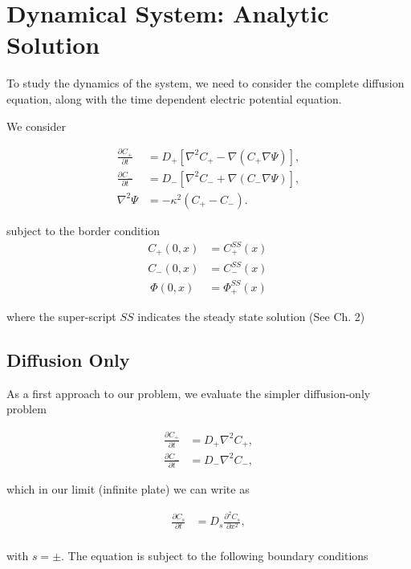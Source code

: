 \section{Dynamical System: Analytic Solution}

To study the dynamics of the system, we need to consider the complete diffusion equation, along with the time dependent electric potential equation.

We consider

\begin{align}
\frac{\partial C_+}{\partial t} &= D_+ \left[\nabla^2 C_+ -  \nabla (C_+ \nabla \Psi) \right] , \\
\frac{\partial C_-}{\partial t} &= D_- \left[\nabla^2 C_- + \nabla (C_- \nabla \Psi) \right], \\
\nabla^2 \Psi &= -\kappa^2 \left(C_+ - C_- \right).
\label{eq:dynamic-system}
\end{align}

subject to the border condition 
\begin{align}
C_+(0, x) & = C^{SS}_+(x)\\
C_-(0, x) & =  C^{SS}_-(x)\\\
\Phi(0, x) &= \Phi^{SS}_+(x)\
\end{align}

where the super-script $SS$ indicates the steady state solution (See Ch. 2)%

\subsection{Diffusion Only}

As a first approach to our problem, we evaluate the simpler diffusion-only problem



\begin{align}
\frac{\partial C_+}{\partial t} &= D_+ \nabla^2 C_+,\\
\frac{\partial C_-}{\partial t} &= D_- \nabla^2 C_-,
\label{eq:diffusion}
\end{align}

which in our limit (infinite plate) we can write as


\begin{align}
\frac{\partial C_s}{\partial t} &= D_s \frac{\partial^2 C_s}{\partial x^2},\\
\label{eq:diffusion-1d}
\end{align}

with $s=\pm$. The equation is subject to the following boundary conditions


